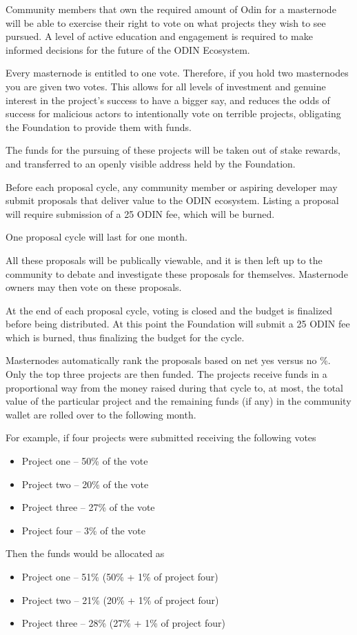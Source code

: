\documentclass[12pt,letterpaper]{article}
\begin{document}
Community members that own the required amount of Odin for a masternode will be able to exercise their right to vote on what projects they wish to see pursued. A level of active education and engagement is required to make informed decisions for the future of the ODIN Ecosystem. 

Every masternode is entitled to one vote. Therefore, if you hold two masternodes you are given two votes. This allows for all levels of investment and genuine interest in the project’s success to have a bigger say, and reduces the odds of success for malicious actors to intentionally vote on terrible projects, obligating the Foundation to provide them with funds.

The funds for the pursuing of these projects will be taken out of stake rewards, and transferred to an openly visible address held by the Foundation.

Before each proposal cycle, any community member or aspiring developer may submit proposals that deliver value to the ODIN ecosystem. Listing a proposal will require submission of a 25 ODIN fee, which will be burned.

One proposal cycle will last for one month.

All these proposals will be publically viewable, and it is then left up to the community to debate and investigate these proposals for themselves. Masternode owners may then vote on these proposals.

At the end of each proposal cycle, voting is closed and the budget is finalized before being distributed. At this point the Foundation will submit a 25 ODIN fee which is burned, thus finalizing the budget for the cycle.

Masternodes automatically rank the proposals based on net yes versus no \%. Only the top three projects are then funded. The projects receive funds in a proportional way from the money raised during that cycle to, at most, the total value of the particular project and the remaining funds (if any) in the community wallet are rolled over to the following month.

For example, if four projects were submitted receiving the following votes
\begin{itemize}
   \item Project one -- 50\% of the vote
   \item Project two -- 20\% of the vote
   \item Project three -- 27\% of the vote
   \item Project four -- 3\% of the vote
\end{itemize}
Then the funds would be allocated as
\begin{itemize}
   \item Project one -- 51\% (50\% + 1\% of project four)
   \item Project two -- 21\% (20\% + 1\% of project four)
   \item Project three -- 28\% (27\% + 1\% of project four)
\end{itemize}
\end{document}
